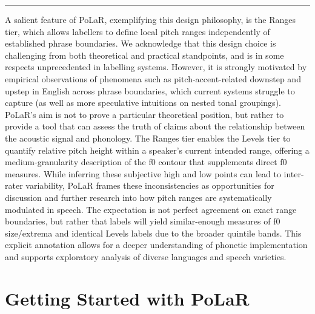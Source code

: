 \documentclass[11pt, twoside]{memoir}
\begin{document}
\hrule


A salient feature of PoLaR, exemplifying this design philosophy, is the Ranges tier, which allows labellers to define local pitch ranges independently of established phrase boundaries. We acknowledge that this design choice is challenging from both theoretical and practical standpoints, and is in some respects unprecedented in labelling systems. However, it is strongly motivated by empirical observations of phenomena such as pitch-accent-related downstep and upstep in English across phrase boundaries, which current systems struggle to capture  (as well as more speculative intuitions on nested tonal groupings). PoLaR's aim is not to prove a particular theoretical position, but rather to provide a tool that can assess the truth of claims about the relationship between the acoustic signal and phonology. The Ranges tier enables the Levels tier to quantify relative pitch height within a speaker's current intended range, offering a medium-granularity description of the f0 contour that supplements direct f0 measures. While inferring these subjective high and low points can lead to inter-rater variability, PoLaR frames these inconsistencies as opportunities for discussion and further research into how pitch ranges are systematically modulated in speech. The expectation is not perfect agreement on exact range boundaries, but rather that labels will yield similar-enough measures of f0 size/extrema and identical Levels labels due to the broader quintile bands. This explicit annotation allows for a deeper understanding of phonetic implementation and supports exploratory analysis of diverse languages and speech varieties.




%
%
	




\chapter{Getting Started with PoLaR}\label{ch:basics}
\end{document}
